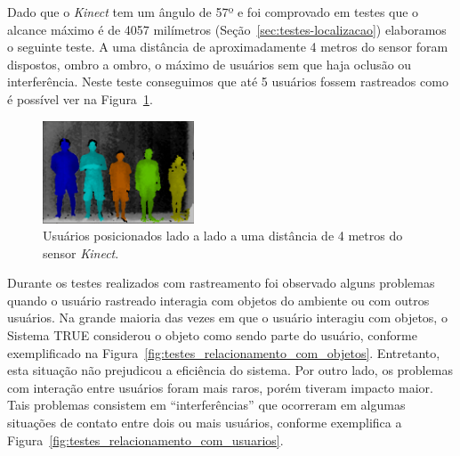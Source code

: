 	Dado que o \textit{Kinect} tem um ângulo de 57º e foi comprovado em testes
	que o alcance máximo é de 4057 milímetros (Seção~\ref{sec:testes-localizacao})
	elaboramos o seguinte teste. A uma distância de aproximadamente 4 metros do
	sensor foram dispostos, ombro a ombro, o máximo de usuários sem que
	haja oclusão ou interferência. Neste teste conseguimos que até 5 usuários
	fossem rastreados como é possível ver na Figura~\ref{fig:max-pessoas}.

	
	

	\begin{figure}[htb]
		\begin{center}
			\includegraphics[width=0.4\textwidth]{figuras/5.Testes/oclusao/max-pessoas.png}
		\end{center}
		\caption{Usuários posicionados lado a lado a uma distância de 4 metros do
		sensor \textit{Kinect}.}
		\label{fig:max-pessoas}
	\end{figure}
		
	Durante os testes realizados com rastreamento foi observado alguns problemas
	quando o usuário rastreado interagia com objetos do ambiente ou com outros
	usuários. Na grande maioria das vezes em que o usuário interagiu com objetos, o
	Sistema TRUE considerou o objeto como sendo parte do usuário, conforme
	exemplificado na Figura~\ref{fig:testes_relacionamento_com_objetos}. Entretanto,
	esta situação não prejudicou a eficiência do sistema. Por outro lado, os
	problemas com interação entre usuários foram mais raros, porém tiveram impacto
	maior. Tais problemas consistem em ``interferências'' que ocorreram em algumas
	situações de contato entre dois ou mais usuários, conforme exemplifica a
	Figura~\ref{fig:testes_relacionamento_com_usuarios}.
	
